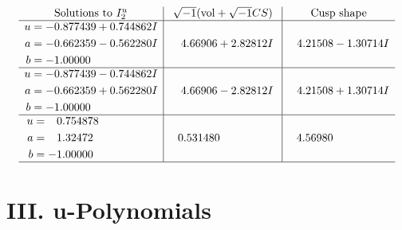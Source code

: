 \documentclass[1p]{elsarticle_modified}
\theoremstyle{definition}
\newcommand{\I}{\sqrt{-1}}
\begin{document}
$$\begin{array}{c|c|c}  
\text{Solutions to }I^u_{2}& \I (\text{vol} + \sqrt{-1}CS) & \text{Cusp shape}\\
 \hline 
\begin{aligned}
u &= -0.877439 + 0.744862 I \\
a &= -0.662359 - 0.562280 I \\
b &= -1.00000\phantom{ +0.000000I}\end{aligned}
 & \phantom{-}4.66906 + 2.82812 I & \phantom{-}4.21508 - 1.30714 I \\ \hline\begin{aligned}
u &= -0.877439 - 0.744862 I \\
a &= -0.662359 + 0.562280 I \\
b &= -1.00000\phantom{ +0.000000I}\end{aligned}
 & \phantom{-}4.66906 - 2.82812 I & \phantom{-}4.21508 + 1.30714 I \\ \hline\begin{aligned}
u &= \phantom{-}0.754878\phantom{ +0.000000I} \\
a &= \phantom{-}1.32472\phantom{ +0.000000I} \\
b &= -1.00000\phantom{ +0.000000I}\end{aligned}
 & \phantom{-}0.531480\phantom{ +0.000000I} & \phantom{-}4.56980\phantom{ +0.000000I}\\
 \hline 
 \end{array}$$\newpage
\newpage\renewcommand{\arraystretch}{1}
\centering \section*{ III. u-Polynomials}
\end{document}
